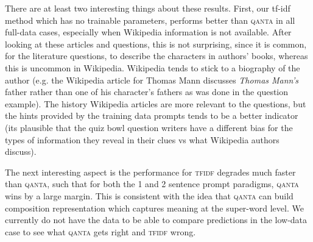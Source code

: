 \documentclass[12pt]{article}
\begin{document}
There are at least two interesting things about these results.
First, our tf-idf method which has no trainable parameters,
performs better than \textsc{qanta} in all full-data cases,
especially when Wikipedia information is not available.
After looking at these articles and questions, this is not surprising,
since it is common, for the literature questions, to describe the characters in authors'
books, whereas this is uncommon in Wikipedia. Wikipedia tends to stick to a biography of
the author (e.g. the Wikipedia article for Thomas Mann discusses {\em Thomas Mann's} father
rather than one of his character's fathers as was done in the question example).
The history Wikipedia articles are more relevant to the questions, but the hints provided
by the training data prompts tends to be a better indicator
(its plausible that the quiz bowl question writers have a different bias
for the types of information they reveal in their clues vs what Wikipedia authors discuss).


The next interesting aspect is the performance for \textsc{tfidf}
degrades much faster than \textsc{qanta}, such that for both the
1 and 2 sentence prompt paradigms, \textsc{qanta} wins by a large margin.
This is consistent with the idea that \textsc{qanta} can build composition
representation which captures meaning at the super-word level.
We currently do not have the data to be able to compare predictions in the
low-data case to see what \textsc{qanta} gets right and \textsc{tfidf} wrong.
\end{document}
